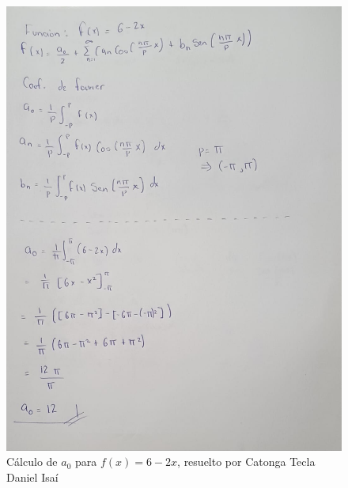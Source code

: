 {\begin{figure}[H]
    \centering
    \includegraphics[width=\linewidth]{Figures/fourierDaniel/fourierDaniel1.jpg}
    \caption[Cálculo de \(a_0\) para \(f(x)=6-2x\)]{Cálculo de \(a_0\) para \(f(x)=6-2x\), resuelto por Catonga Tecla Daniel Isaí}
    \label{fig:figure-daniel-01}
\end{figure}

}
